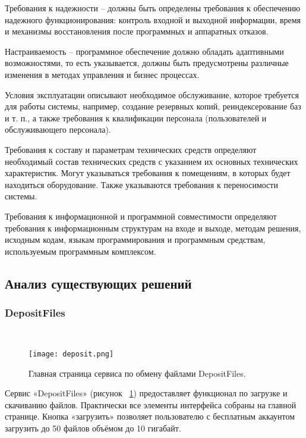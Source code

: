 Требования к надежности – должны быть определены требования к обеспечению надежного функционирования: контроль входной и выходной информации, время и механизмы восстановления после программных и аппаратных отказов. 

Настраиваемость – программное обеспечение должно обладать адаптивными возможностями, то есть указывается, должны быть предусмотрены различные изменения в методах управления и бизнес процессах.

Условия эксплуатации описывают необходимое обслуживание, которое требуется для работы системы, например, создание резервных копий, реиндексерование баз и т. п., а также требования к квалификации персонала (пользователей и обслуживающего персонала).

Требования к составу и параметрам технических средств определяют необходимый состав технических средств с указанием их основных технических характеристик. Могут указываться требования к помещениям, в которых будет находиться оборудование. Также указываются требования к переносимости системы.

Требования к информационной и программной совместимости определяют требования к информационным структурам на входе и выходе, методам решения, исходным кодам, языкам программирования и программным средствам, используемым программным комплексом.

\subsection{Анализ существующих решений}
\label{sec:practice:itechart_characteristic:analiz}

\subsubsection{DepositFiles}~\\
\label{ssub:practice:itechart_characteristic:depositfiles}   


\begin{figure}[ht]
  \centering
  \texttt{[image: deposit.png]}  
    \caption{ Главная страница сервиса по обмену файлами DepositFiles. }
    \label{fig:deposit}
\end{figure}


Сервис «DepositFiles» (рисунок ~\ref{fig:deposit}) предоставляет функционал по загрузке и скачиванию файлов. Практически все элементы интерфейса собраны на главной странице. Кнопка «загрузить» позволяет пользователю с бесплатным аккаунтом загрузить до 50 файлов объёмом до 10 гигабайт. 

